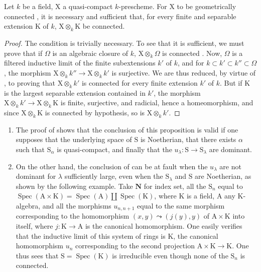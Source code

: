 \begin{corollary}[8.4.5]
\label{IV.8.4.5}
Let $k$ be a field, $\mathrm{X}$ a quasi-compact $k$-prescheme.
For $\mathrm{X}$ to be geometrically connected , it is necessary and sufficient that, for every finite and separable extension $\mathrm{K}$ of $k$, $\mathrm{X}\otimes_k\mathrm{K}$ be connected.
\end{corollary}

\begin{proof}
The condition is trivially necessary.
To see that it is sufficient, we must prove that if $\Omega$ is an algebraic closure of $k$, $\mathrm{X}\otimes_k\Omega$ is connected .
Now, $\Omega$ is a filtered inductive limit of the finite subextensions $k'$ of $k$, and for $k\subset k'\subset k''\subset\Omega$, the morphism $\mathrm{X}\otimes_k k''\to\mathrm{X}\otimes_k k'$ is surjective.
We are thus reduced, by virtue of , to proving that $\mathrm{X}\otimes_k k'$ is connected for every finite extension $k'$ of $k$.
But if $\mathrm{K}$ is the largest separable extension contained in $k'$, the morphism $\mathrm{X}\otimes_k k'\to\mathrm{X}\otimes_k\mathrm{K}$ is finite, surjective, and radicial, hence  a homeomorphism, and since $\mathrm{X}\otimes_k\mathrm{K}$ is connected by hypothesis, so is $\mathrm{X}\otimes_k k'$.
\end{proof}

\begin{remarks}[8.4.6]
\label{IV.8.4.6}
\begin{enumerate}[label=(\roman*)]
  \item The proof of  shows that the conclusion of this proposition is valid if one supposes that the underlying space of $\mathrm{S}$ is Noetherian, that there exists $\alpha$ such that $\mathrm{S}_\alpha$ is quasi-compact, and finally that the $u_\lambda:\mathrm{S}\to\mathrm{S}_\lambda$ are dominant.
  \item On the other hand, the conclusion of  can be at fault when the $u_\lambda$ are not dominant for $\lambda$ sufficiently large, even when the $\mathrm{S}_\lambda$ and $\mathrm{S}$ are Noetherian, as shown by the following example.
Take $\mathbf{N}$ for index set, all the $\mathrm{S}_n$ equal to $\operatorname{Spec}(\mathrm{A}\times\mathrm{K})=\operatorname{Spec}(\mathrm{A})\amalg\operatorname{Spec}(\mathrm{K})$, where $\mathrm{K}$ is a field, $\mathrm{A}$ any $\mathrm{K}$-algebra, and all the morphisms $u_{n,n+1}$ equal to the same morphism corresponding to the homomorphism $(x,y)\leadsto(j(y),y)$ of $\mathrm{A}\times\mathrm{K}$ into itself, where $j:\mathrm{K}\to\mathrm{A}$ is the canonical homomorphism.
One easily verifies that the inductive limit of this system of rings is $\mathrm{K}$, the canonical homomorphism $u_n$ corresponding to the second projection $\mathrm{A}\times\mathrm{K}\to\mathrm{K}$.
One thus sees that $\mathrm{S}=\operatorname{Spec}(\mathrm{K})$ is irreducible even though none of the $\mathrm{S}_n$ is connected.
\end{enumerate}
\end{remarks}

